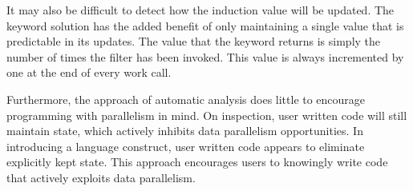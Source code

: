
It may also be difficult to detect how the induction value will be
updated. The keyword solution has the added benefit of only maintaining
a single value that is predictable in its updates. The value that the 
keyword returns is simply the number of times the filter has been 
invoked. This value is always incremented by one at the end of every work call.

Furthermore, the approach of automatic analysis does little to
encourage programming with parallelism in mind. On inspection, user
written code will still maintain state, which actively inhibits data
parallelism opportunities. In introducing a language construct, user
written code appears to eliminate explicitly kept state. This approach
encourages users to knowingly write code that actively exploits
data parallelism.


